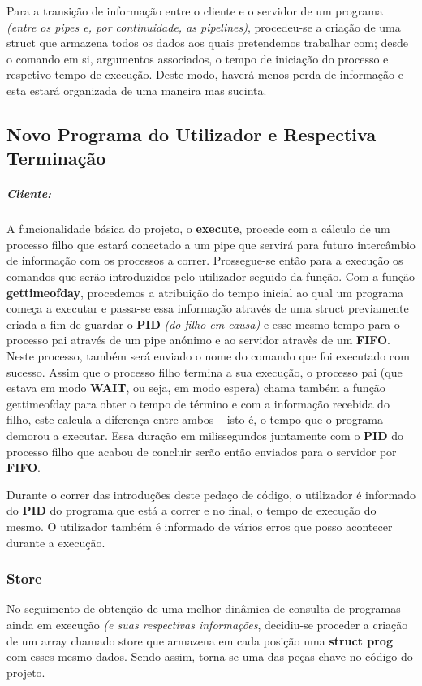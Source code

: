 \documentclass[11.5pt,a4paper]{report}
\begin{document}
Para a transição de informação entre o cliente e o servidor de um programa \textit{(entre os pipes e, por continuidade, as pipelines)}, procedeu-se a criação de uma struct que armazena todos os dados aos quais pretendemos trabalhar com; desde o comando em si, argumentos associados, o tempo de iniciação do processo e respetivo tempo de execução. Deste modo, haverá menos perda de informação e esta estará organizada de uma maneira mas sucinta.

\newpage
\subsection{Novo Programa do Utilizador e Respectiva Terminação}

\subparagraph{Cliente:}
A funcionalidade básica do projeto, o \textbf{execute}, procede com a cálculo de um processo filho que estará conectado a um pipe que servirá para futuro intercâmbio de informação com os processos a correr. Prossegue-se então para a execução os comandos que serão introduzidos pelo utilizador seguido da função.
Com a função \textbf{gettimeofday}, procedemos a atribuição do tempo inicial ao qual um programa começa a executar e passa-se essa informação através de uma struct previamente criada a fim de guardar o \textbf{PID} \textit{(do filho em causa)} e esse mesmo tempo para o processo pai através de um pipe anónimo e ao servidor atravès de um \textbf{FIFO}.\\
Neste processo, também será enviado o nome do comando que foi executado com sucesso.
Assim que o processo filho termina a sua execução, o processo pai (que estava em modo \textbf{WAIT}, ou seja, em modo espera) chama também a função gettimeofday para obter o tempo de término e com a informação recebida do filho, este calcula a diferença entre ambos – isto é, o tempo que o programa demorou a executar. Essa duração em milissegundos juntamente com o \textbf{PID} do processo filho que acabou de concluir serão então enviados para o servidor por \textbf{FIFO}.\par

Durante o correr das introduções deste pedaço de código, o utilizador é informado do \textbf{PID} do programa que está a correr e no final, o tempo de execução do mesmo. O utilizador também é informado de vários erros que posso acontecer durante a execução.

\subsubsection{\underline{Store}}
No seguimento de obtenção de uma melhor dinâmica de consulta de programas ainda em execução \textit{(e suas respectivas informações}, decidiu-se proceder a criação de um array chamado store que armazena em cada posição uma \textbf{struct prog} com esses mesmo dados. Sendo assim, torna-se uma das peças chave no código do projeto.
\end{document}
